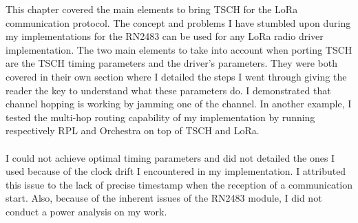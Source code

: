This chapter covered the main elements to bring TSCH for the LoRa communication
protocol.
The concept and problems I have stumbled upon during my implementations for the
RN2483 can be used for any LoRa radio driver implementation.
The two main elements to take into account when porting TSCH are the TSCH timing
parameters and the driver's parameters.
They were both covered in their own section where I detailed the steps I went
through giving the reader the key to understand what these parameters do.
I demonstrated that channel hopping is working by jamming one of
the channel.
In another example, I tested the multi-hop routing capability of my
implementation by running respectively RPL and Orchestra on top of TSCH and
LoRa.

\paragraph{}

I could not achieve optimal timing parameters and did not detailed the ones
I used because of the clock drift I encountered in my
implementation.
I attributed this issue to the lack of precise timestamp when the reception of
a communication start.
Also, because of the inherent issues of the RN2483 module, I did not conduct
a power analysis on my work.
